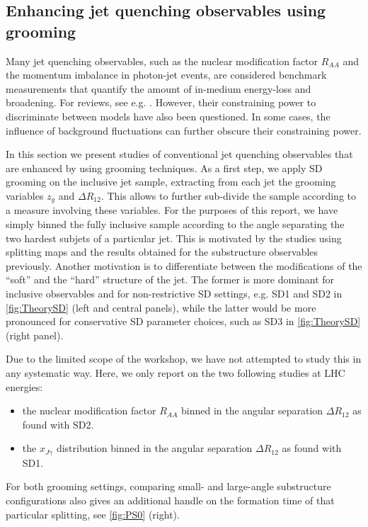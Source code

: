 \subsection{Enhancing jet quenching observables using grooming}
\label{sec:dissecting}

Many jet quenching observables, such as the nuclear modification factor $R_{AA}$ and the momentum imbalance in photon-jet events, are considered benchmark measurements that quantify the amount of in-medium energy-loss and broadening. For reviews, see e.g. \cite{dEnterria:2009xfs,Majumder:2010qh}. However, their constraining power to discriminate between models have also been questioned. In some cases, the influence of background fluctuations can further obscure their constraining power.

In this section we present studies of conventional jet quenching observables that are enhanced by using grooming techniques.  As a first step, we apply SD grooming on the inclusive jet sample, extracting from each jet the grooming variables $z_g$ and $\Delta R_{12}$. 
This allows to further sub-divide the sample according to a measure involving these variables. 
For the purposes of this report, we have simply binned the fully inclusive sample according to the angle separating the two hardest subjets of a particular jet. This is motivated by the studies using splitting maps and the results obtained for the substructure observables previously. Another motivation is to differentiate between the modifications of the ``soft'' and the ``hard'' structure of the jet. The former is more dominant for inclusive observables and for non-restrictive SD settings, e.g. SD1 and SD2 in \autoref{fig:TheorySD} (left and central panels), while the latter would be more pronounced for conservative SD parameter choices, such as SD3 in \autoref{fig:TheorySD} (right panel).

Due to the limited scope of the workshop, we have not attempted to study this in any systematic way. Here, we only report on the two following studies at LHC energies:
\begin{itemize} 

\item the nuclear modification factor $R_{AA}$ binned in the angular separation $\Delta R_{12}$ as found with SD2.

\item the $x_{J\gamma}$ distribution binned in the angular separation $\Delta R_{12}$ as found with SD1. 
\end{itemize}
For both grooming settings, comparing small- and large-angle substructure configurations also gives an additional handle on the formation time of that particular splitting, see \autoref{fig:PS0} (right).

